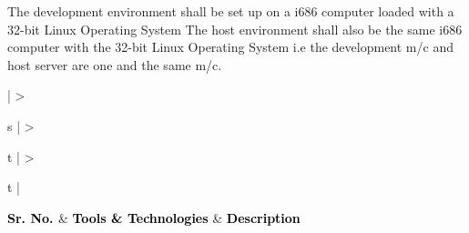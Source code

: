 \documentclass[hidelinks,a4paper,12pt]{article}
\begin{document}
The development environment shall be set up on a i686 computer loaded with a 32-bit Linux Operating System 
The host environment shall also be the same i686 computer with the 32-bit Linux Operating System i.e the development m/c and host server are one and the same m/c.
\\
\noindent
	\begin{center}
				
							
		{
		\setlength{\extrarowheight}{2pt}
						
							
		\newcolumntype{b}{X}
		
		\renewcommand\thetable{2} 					
		 \label{table:2}
		\vspace{0.25cm}
									
		\begin{tabularx}{\textwidth}{ | >{\ttfamily\raggedright\arraybackslash} s 
		  | >{\ttfamily\raggedright\arraybackslash} t 
		  | >{\ttfamily\raggedright\arraybackslash} t | }
								
		\hline
								
		{\textbf{\textcolor{black}{\large {Sr. No.} \newline}}} & {\textbf{\textcolor{black}{\large {Tools \& Technologies}}}} & \textbf{\textcolor{black}{\large {Description}}} \\
								

\end{tabularx}}
\end{center}
\end{document}
